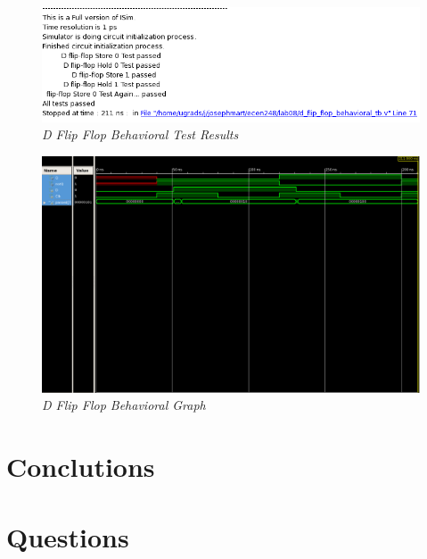 \documentclass[a4paper,12pt]{article}
\begin{document}
  \begin{figure}[h]
    \begin{center}
      \includegraphics[scale=0.2]{d_flipflip_behavioral_tests.png}
      \caption{\textit{D Flip Flop Behavioral Test Results}}
    \end{center}
  \end{figure}
  
  \newpage
  
  \begin{figure}[h]
    \begin{center}
      \includegraphics[scale=0.2]{d_flipflip_behavioral_graph.png}
      \caption{\textit{D Flip Flop Behavioral Graph}}
    \end{center}
  \end{figure}
  
  
  
\section*{Conclutions}

\section*{Questions}
\end{document}
